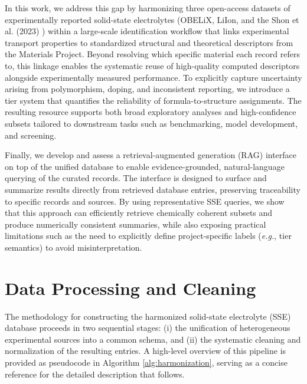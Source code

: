 \documentclass[a4paper,fleqn]{cas-sc}
\begin{document}
In this work, we address this gap by harmonizing three open-access datasets of experimentally reported solid-state electrolytes (OBELiX, LiIon, and the Shon et al. (2023) \cite{shon2023extracting}) within a large-scale identification workflow that links experimental transport properties to standardized structural and theoretical descriptors from the Materials Project. Beyond resolving which specific material each record refers to, this linkage enables the systematic reuse of high-quality computed descriptors alongside experimentally measured performance. To explicitly capture uncertainty arising from polymorphism, doping, and inconsistent reporting, we introduce a tier system that quantifies the reliability of formula-to-structure assignments. The resulting resource supports both broad exploratory analyses and high-confidence subsets tailored to downstream tasks such as benchmarking, model development, and screening.

Finally, we develop and assess a retrieval-augmented generation (RAG) interface on top of the unified database to enable evidence-grounded, natural-language querying of the curated records. The interface is designed to surface and summarize results directly from retrieved database entries, preserving traceability to specific records and sources. By using representative SSE queries, we show that this approach can efficiently retrieve chemically coherent subsets and produce numerically consistent summaries, while also exposing practical limitations such as the need to explicitly define project-specific labels (\textit{e.g.}, tier semantics) to avoid misinterpretation. 

\section{Data Processing and Cleaning}

The methodology for constructing the harmonized solid-state electrolyte (SSE) database proceeds in two sequential stages: (i) the unification of heterogeneous experimental sources into a common schema, and (ii) the systematic cleaning and normalization of the resulting entries. A high-level overview of this pipeline is provided as pseudocode in Algorithm \ref{alg:harmonization}, serving as a concise reference for the detailed description that follows.
\end{document}
